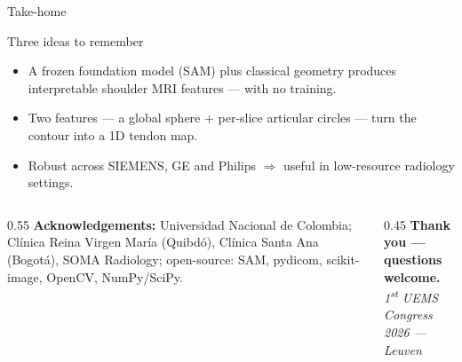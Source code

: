 \begin{frame}{Take-home}
  \begin{block}{Three ideas to remember}
    \begin{itemize}
      \item A \alert{frozen foundation model} (SAM) plus \alert{classical geometry} produces interpretable shoulder MRI features --- with no training.
      \item Two features --- a \alert{global sphere} + \alert{per-slice articular circles} --- turn the contour into a \alert{1D tendon map}.
      \item Robust across SIEMENS, GE and Philips $\Rightarrow$ useful in low-resource radiology settings.
    \end{itemize}
  \end{block}

  \vspace{0.4em}
  \begin{columns}[T]
    \begin{column}{0.55\textwidth}
      {\scriptsize \textbf{Acknowledgements:} Universidad Nacional de Colombia; Cl\'inica Reina Virgen Mar\'ia (Quibd\'o), Cl\'inica Santa Ana (Bogot\'a), SOMA Radiology; open-source: SAM, pydicom, scikit-image, OpenCV, NumPy/SciPy.}
    \end{column}
    \begin{column}{0.45\textwidth}
      \centering
      \large \textcolor{medBlue}{\textbf{Thank you --- questions welcome.}}\\[0.2em]
      \scriptsize \textit{1\textsuperscript{st} UEMS Congress 2026 --- Leuven}
    \end{column}
  \end{columns}
\end{frame}

